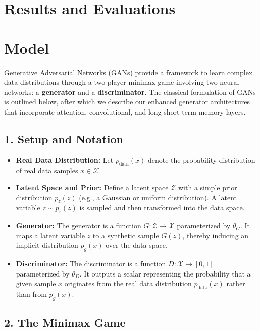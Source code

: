 \documentclass{article}
\begin{document}
\section{Results and Evaluations}

\section{Model}

Generative Adversarial Networks (GANs) provide a framework to learn complex data distributions through a two-player minimax game involving two neural networks: a \textbf{generator} and a \textbf{discriminator}. The classical formulation of GANs is outlined below, after which we describe our enhanced generator architectures that incorporate attention, convolutional, and long short-term memory layers.

\subsection*{1. Setup and Notation}

\begin{itemize}
    \item \textbf{Real Data Distribution:} Let $p_{\text{data}}(x)$ denote the probability distribution of real data samples $x \in \mathcal{X}$.
    \item \textbf{Latent Space and Prior:} Define a latent space $\mathcal{Z}$ with a simple prior distribution $p_z(z)$ (e.g., a Gaussian or uniform distribution). A latent variable $z \sim p_z(z)$ is sampled and then transformed into the data space.
    \item \textbf{Generator:} The generator is a function $G: \mathcal{Z} \to \mathcal{X}$ parameterized by $\theta_G$. It maps a latent variable $z$ to a synthetic sample $G(z)$, thereby inducing an implicit distribution $p_g(x)$ over the data space.
    \item \textbf{Discriminator:} The discriminator is a function $D: \mathcal{X} \to [0,1]$ parameterized by $\theta_D$. It outputs a scalar representing the probability that a given sample $x$ originates from the real data distribution $p_{\text{data}}(x)$ rather than from $p_g(x)$.
\end{itemize}

\subsection*{2. The Minimax Game}
\end{document}
